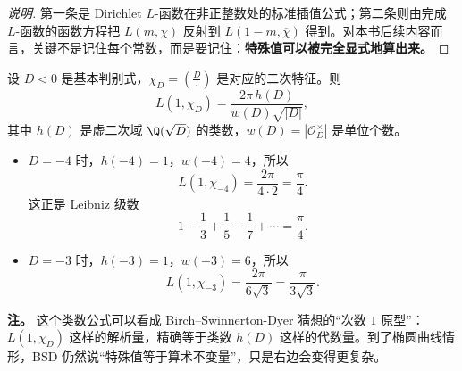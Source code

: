 \begin{proof}[说明]
第一条是 Dirichlet $L$-函数在非正整数处的标准插值公式；第二条则由完成 $L$-函数的函数方程把 $L(m,\chi)$ 反射到 $L(1-m,\overline{\chi})$ 得到。对本书后续内容而言，关键不是记住每个常数，而是要记住：\textbf{特殊值可以被完全显式地算出来。}
\end{proof}

\begin{theorem}
\label{thm:dirichlet-class-number}
设 $D<0$ 是基本判别式，$\chi_D=\left(\frac{D}{\cdot}\right)$ 是对应的二次特征。则
\[
  L(1,\chi_D)=\frac{2\pi\,h(D)}{w(D)\sqrt{|D|}},
\]
其中 $h(D)$ 是虚二次域 $\Q(\sqrt{D})$ 的类数，$w(D)=|\mathcal{O}_D^\times|$ 是单位个数。
\end{theorem}

\begin{example}[两个最经典的特殊值]
\label{ex:quadratic-L-values}
\leavevmode
\begin{itemize}
  \item $D=-4$ 时，$h(-4)=1$，$w(-4)=4$，所以
    \[
      L(1,\chi_{-4})=\frac{2\pi}{4\cdot 2}=\frac{\pi}{4}.
    \]
    这正是 Leibniz 级数
    \[
      1-\frac13+\frac15-\frac17+\cdots=\frac{\pi}{4}.
    \]
  \item $D=-3$ 时，$h(-3)=1$，$w(-3)=6$，所以
    \[
      L(1,\chi_{-3})=\frac{2\pi}{6\sqrt3}=\frac{\pi}{3\sqrt3}.
    \]
\end{itemize}
\end{example}

\textbf{注。} 这个类数公式可以看成 Birch--Swinnerton-Dyer 猜想的“次数 $1$ 原型”：$L(1,\chi_D)$ 这样的解析量，精确等于类数 $h(D)$ 这样的代数量。到了椭圆曲线情形，BSD 仍然说“特殊值等于算术不变量”，只是右边会变得更复杂。


